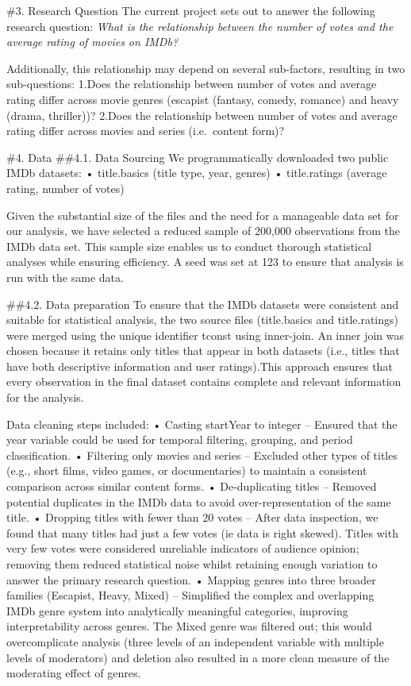 \documentclass[
  11pt,
]{article}
\begin{document}
\#3. Research Question The current project sets out to answer the
following research question: \emph{What is the relationship between the
number of votes and the average rating of movies on IMDb?}

Additionally, this relationship may depend on several sub-factors,
resulting in two sub-questions: 1.Does the relationship between number
of votes and average rating differ across movie genres (escapist
(fantasy, comedy, romance) and heavy (drama, thriller))? 2.Does the
relationship between number of votes and average rating differ across
movies and series (i.e.~content form)?

\#4. Data \#\#4.1. Data Sourcing We programmatically downloaded two
public IMDb datasets: • title.basics (title type, year, genres) •
title.ratings (average rating, number of votes)

Given the substantial size of the files and the need for a manageable
data set for our analysis, we have selected a reduced sample of 200,000
observations from the IMDb data set. This sample size enables us to
conduct thorough statistical analyses while ensuring efficiency. A seed
was set at 123 to ensure that analysis is run with the same data.

\#\#4.2. Data preparation To ensure that the IMDb datasets were
consistent and suitable for statistical analysis, the two source files
(title.basics and title.ratings) were merged using the unique identifier
tconst using inner-join. An inner join was chosen because it retains
only titles that appear in both datasets (i.e., titles that have both
descriptive information and user ratings).This approach ensures that
every observation in the final dataset contains complete and relevant
information for the analysis.

Data cleaning steps included: • Casting startYear to integer -- Ensured
that the year variable could be used for temporal filtering, grouping,
and period classification. • Filtering only movies and series --
Excluded other types of titles (e.g., short films, video games, or
documentaries) to maintain a consistent comparison across similar
content forms. • De-duplicating titles -- Removed potential duplicates
in the IMDb data to avoid over-representation of the same title. •
Dropping titles with fewer than 20 votes -- After data inspection, we
found that many titles had just a few votes (ie data is right skewed).
Titles with very few votes were considered unreliable indicators of
audience opinion; removing them reduced statistical noise whilst
retaining enough variation to answer the primary research question. •
Mapping genres into three broader families (Escapist, Heavy, Mixed) --
Simplified the complex and overlapping IMDb genre system into
analytically meaningful categories, improving interpretability across
genres. The Mixed genre was filtered out; this would overcomplicate
analysis (three levels of an independent variable with multiple levels
of moderators) and deletion also resulted in a more clean measure of the
moderating effect of genres.
\end{document}
